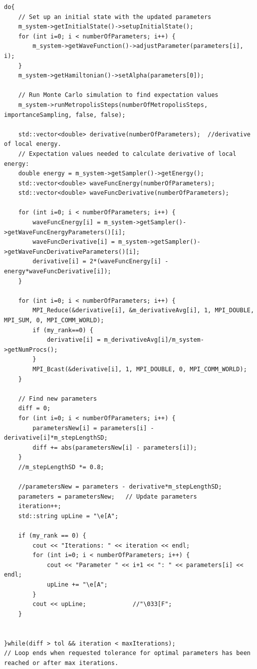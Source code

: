 \documentclass[../main.tex]{subfiles}
\begin{document}
\lstset{language=c++}
\begin{lstlisting}[caption={Loop for variation of the variational parameters using the steepest descent method.}]
do{
    // Set up an initial state with the updated parameters
    m_system->getInitialState()->setupInitialState();
    for (int i=0; i < numberOfParameters; i++) {
        m_system->getWaveFunction()->adjustParameter(parameters[i], i);
    }
    m_system->getHamiltonian()->setAlpha(parameters[0]);

    // Run Monte Carlo simulation to find expectation values
    m_system->runMetropolisSteps(numberOfMetropolisSteps, importanceSampling, false, false);

    std::vector<double> derivative(numberOfParameters);  //derivative of local energy.
    // Expectation values needed to calculate derivative of local energy:
    double energy = m_system->getSampler()->getEnergy();
    std::vector<double> waveFuncEnergy(numberOfParameters);
    std::vector<double> waveFuncDerivative(numberOfParameters);

    for (int i=0; i < numberOfParameters; i++) {
        waveFuncEnergy[i] = m_system->getSampler()->getWaveFuncEnergyParameters()[i];
        waveFuncDerivative[i] = m_system->getSampler()->getWaveFuncDerivativeParameters()[i];
        derivative[i] = 2*(waveFuncEnergy[i] - energy*waveFuncDerivative[i]);
    }

    for (int i=0; i < numberOfParameters; i++) {
        MPI_Reduce(&derivative[i], &m_derivativeAvg[i], 1, MPI_DOUBLE, MPI_SUM, 0, MPI_COMM_WORLD);
        if (my_rank==0) {
            derivative[i] = m_derivativeAvg[i]/m_system->getNumProcs();
        }
        MPI_Bcast(&derivative[i], 1, MPI_DOUBLE, 0, MPI_COMM_WORLD);
    }

    // Find new parameters
    diff = 0;
    for (int i=0; i < numberOfParameters; i++) {
        parametersNew[i] = parameters[i] - derivative[i]*m_stepLengthSD;
        diff += abs(parametersNew[i] - parameters[i]);
    }
    //m_stepLengthSD *= 0.8;

    //parametersNew = parameters - derivative*m_stepLengthSD;
    parameters = parametersNew;   // Update parameters
    iteration++;
    std::string upLine = "\e[A";

    if (my_rank == 0) {
        cout << "Iterations: " << iteration << endl;
        for (int i=0; i < numberOfParameters; i++) {
            cout << "Parameter " << i+1 << ": " << parameters[i] << endl;
            upLine += "\e[A";
        }
        cout << upLine;             //"\033[F";
    }


}while(diff > tol && iteration < maxIterations);
// Loop ends when requested tolerance for optimal parameters has been reached or after max iterations.
\end{lstlisting}
\end{document}
